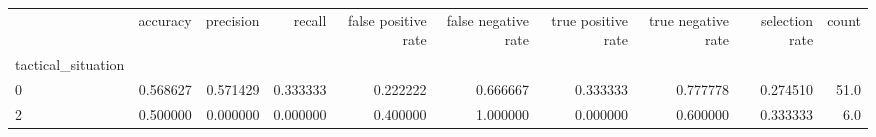 \begin{tabular}{lrrrrrrrrr}
\toprule
{} &  accuracy &  precision &    recall &  false positive rate &  false negative rate &  true positive rate &  true negative rate &  selection rate &  count \\
tactical\_situation &           &            &           &                      &                      &                     &                     &                 &        \\
\midrule
0                  &  0.568627 &   0.571429 &  0.333333 &             0.222222 &             0.666667 &            0.333333 &            0.777778 &        0.274510 &   51.0 \\
2                  &  0.500000 &   0.000000 &  0.000000 &             0.400000 &             1.000000 &            0.000000 &            0.600000 &        0.333333 &    6.0 \\
\bottomrule
\end{tabular}
